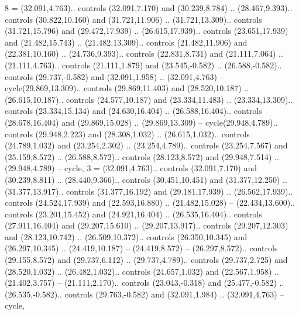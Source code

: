 {8} = {(32.091,4.763).. controls (32.091,7.170) and (30.239,8.784) .. (28.467,9.393).. controls (30.822,10.160) and (31.721,11.906) .. (31.721,13.309).. controls (31.721,15.796) and (29.472,17.939) .. (26.615,17.939).. controls (23.651,17.939) and (21.482,15.743) .. (21.482,13.309).. controls (21.482,11.906) and (22.381,10.160) .. (24.736,9.393).. controls (22.831,8.731) and (21.111,7.064) .. (21.111,4.763).. controls (21.111,1.879) and (23.545,-0.582) .. (26.588,-0.582).. controls (29.737,-0.582) and (32.091,1.958) .. (32.091,4.763) -- cycle(29.869,13.309).. controls (29.869,11.403) and (28.520,10.187) .. (26.615,10.187).. controls (24.577,10.187) and (23.334,11.483) .. (23.334,13.309).. controls (23.334,15.134) and (24.630,16.404) .. (26.588,16.404).. controls (28.678,16.404) and (29.869,15.028) .. (29.869,13.309) -- cycle(29.948,4.789).. controls (29.948,2.223) and (28.308,1.032) .. (26.615,1.032).. controls (24.789,1.032) and (23.254,2.302) .. (23.254,4.789).. controls (23.254,7.567) and (25.159,8.572) .. (26.588,8.572).. controls (28.123,8.572) and (29.948,7.514) .. (29.948,4.789) -- cycle},
{3} = {(32.091,4.763).. controls (32.091,7.170) and (30.239,8.811) .. (28.440,9.366).. controls (30.451,10.451) and (31.377,12.250) .. (31.377,13.917).. controls (31.377,16.192) and (29.181,17.939) .. (26.562,17.939).. controls (24.524,17.939) and (22.593,16.880) .. (21.482,15.028) -- (22.434,13.600).. controls (23.201,15.452) and (24.921,16.404) .. (26.535,16.404).. controls (27.911,16.404) and (29.207,15.610) .. (29.207,13.917).. controls (29.207,12.303) and (28.123,10.742) .. (26.509,10.372).. controls (26.350,10.345) and (26.297,10.345) .. (24.419,10.187) -- (24.419,8.572) -- (26.297,8.572).. controls (29.155,8.572) and (29.737,6.112) .. (29.737,4.789).. controls (29.737,2.725) and (28.520,1.032) .. (26.482,1.032).. controls (24.657,1.032) and (22.567,1.958) .. (21.402,3.757) -- (21.111,2.170).. controls (23.043,-0.318) and (25.477,-0.582) .. (26.535,-0.582).. controls (29.763,-0.582) and (32.091,1.984) .. (32.091,4.763) -- cycle},
